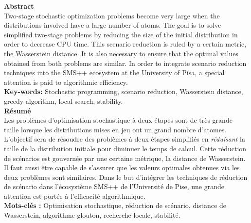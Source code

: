 \documentclass{amsart}
\begin{document}
\begin{titlepage}

    \vspace*{1cm}
        \Large\textbf{Abstract} \\
    
    \normalsize Two-stage stochastic optimization problems become very large when the distributions involved have a large number of atoms. The goal is to solve simplified two-stage problems by reducing the size of the initial distribution in order to decrease CPU time. This scenario reduction is ruled by a certain metric, the Wasserstein distance. It is also necessary to ensure that the optimal values obtained from both problems are similar. In order to integrate scenario reduction techniques into the SMS++ ecosystem at the University of Pisa, a special attention is paid to algorithmic efficiency. \\ 
    
    \textbf{Key-words:} Stochastic programming, scenario reduction, Wasserstein distance, greedy algorithm, local-search, stability.
  \\

        \vspace*{1cm}
        \Large\textbf{Résumé} \\
    
    \normalsize Les problèmes d'optimisation stochastique à deux étapes sont de très grande taille lorsque les distributions mises en jeu ont un grand nombre d'atomes. L'objectif sera de résoudre des problèmes à deux étapes simplifiés en \emph{réduisant} la taille de la distribution initiale pour diminuer le temps de calcul. Cette réduction de scénarios est gouvernée par une certaine métrique, la distance de Wasserstein. Il faut aussi être capable de s'assurer que les valeurs optimales obtenues via les deux problèmes sont similaires. Dans le but d'intégrer les techniques de réduction de scénario dans l'écosystème SMS++ de l'Université de Pise, une grande attention est portée à l'efficacité algorithmique. \\
    
    \textbf{Mots-clés :} Optimisation stochastique, réduction de scénario, distance de Wasserstein, algorithme glouton, recherche locale, stabilité.
    
\end{titlepage}


\tableofcontents

\newpage
\pagestyle{fancy} %
\fancyfoot[R]{\thepage/\pageref{LastPage}} 
\end{document}
